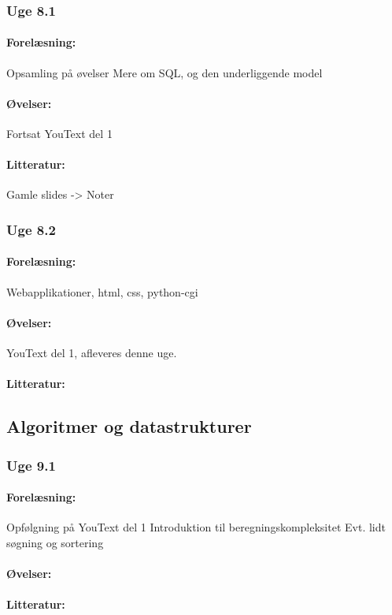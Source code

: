 \documentclass[12pt]{article}
\begin{document}
\subsubsection{Uge 8.1}
\paragraph{Forelæsning:} 
Opsamling på øvelser
Mere om SQL, og den underliggende model
\paragraph{Øvelser:}
Fortsat YouText del 1
\paragraph{Litteratur:} Gamle slides -> Noter 

\subsubsection{Uge 8.2}
\paragraph{Forelæsning:} 
Webapplikationer, html, css, python-cgi
\paragraph{Øvelser:}
YouText del 1, afleveres denne uge.
\paragraph{Litteratur:}

\subsection{Algoritmer og datastrukturer}
\subsubsection{Uge 9.1}
\paragraph{Forelæsning:}
Opfølgning på YouText del 1
Introduktion til beregningskompleksitet
Evt. lidt søgning og sortering
\paragraph{Øvelser:}
\paragraph{Litteratur:}
\end{document}
